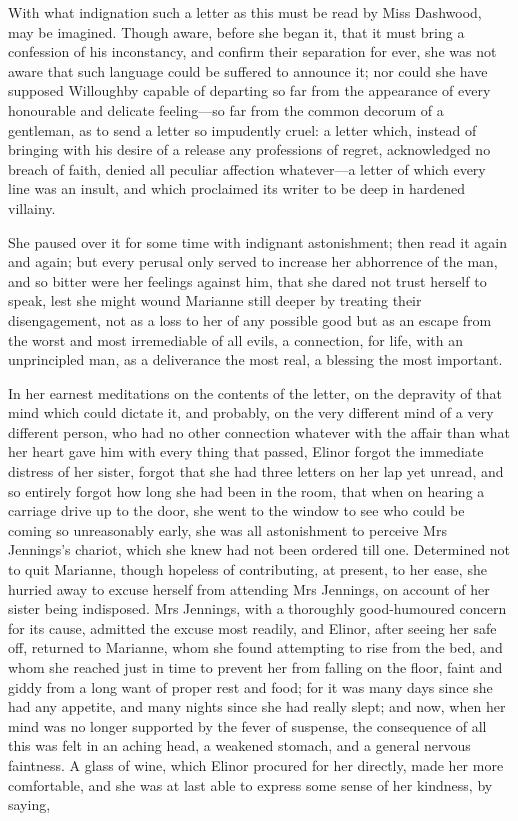 With what indignation such a letter as this must be read by Miss Dashwood, may be imagined. Though aware, before she began it, that it must bring a confession of his inconstancy, and confirm their separation for ever, she was not aware that such language could be suffered to announce it; nor could she have supposed Willoughby capable of departing so far from the appearance of every honourable and delicate feeling—so far from the common decorum of a gentleman, as to send a letter so impudently cruel: a letter which, instead of bringing with his desire of a release any professions of regret, acknowledged no breach of faith, denied all peculiar affection whatever—a letter of which every line was an insult, and which proclaimed its writer to be deep in hardened villainy.

She paused over it for some time with indignant astonishment; then read it again and again; but every perusal only served to increase her abhorrence of the man, and so bitter were her feelings against him, that she dared not trust herself to speak, lest she might wound Marianne still deeper by treating their disengagement, not as a loss to her of any possible good but as an escape from the worst and most irremediable of all evils, a connection, for life, with an unprincipled man, as a deliverance the most real, a blessing the most important.

In her earnest meditations on the contents of the letter, on the depravity of that mind which could dictate it, and probably, on the very different mind of a very different person, who had no other connection whatever with the affair than what her heart gave him with every thing that passed, Elinor forgot the immediate distress of her sister, forgot that she had three letters on her lap yet unread, and so entirely forgot how long she had been in the room, that when on hearing a carriage drive up to the door, she went to the window to see who could be coming so unreasonably early, she was all astonishment to perceive Mrs Jennings’s chariot, which she knew had not been ordered till one. Determined not to quit Marianne, though hopeless of contributing, at present, to her ease, she hurried away to excuse herself from attending Mrs Jennings, on account of her sister being indisposed. Mrs Jennings, with a thoroughly good-humoured concern for its cause, admitted the excuse most readily, and Elinor, after seeing her safe off, returned to Marianne, whom she found attempting to rise from the bed, and whom she reached just in time to prevent her from falling on the floor, faint and giddy from a long want of proper rest and food; for it was many days since she had any appetite, and many nights since she had really slept; and now, when her mind was no longer supported by the fever of suspense, the consequence of all this was felt in an aching head, a weakened stomach, and a general nervous faintness. A glass of wine, which Elinor procured for her directly, made her more comfortable, and she was at last able to express some sense of her kindness, by saying,

